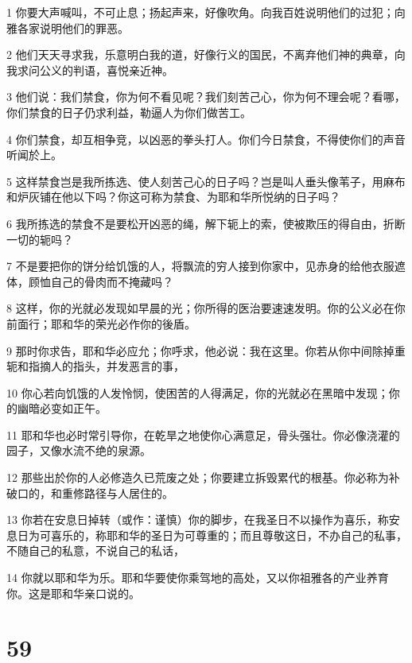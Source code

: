 \par 1 你要大声喊叫，不可止息；扬起声来，好像吹角。向我百姓说明他们的过犯；向雅各家说明他们的罪恶。
\par 2 他们天天寻求我，乐意明白我的道，好像行义的国民，不离弃他们神的典章，向我求问公义的判语，喜悦亲近神。
\par 3 他们说：我们禁食，你为何不看见呢？我们刻苦己心，你为何不理会呢？看哪，你们禁食的日子仍求利益，勒逼人为你们做苦工。
\par 4 你们禁食，却互相争竞，以凶恶的拳头打人。你们今日禁食，不得使你们的声音听闻於上。
\par 5 这样禁食岂是我所拣选、使人刻苦己心的日子吗？岂是叫人垂头像苇子，用麻布和炉灰铺在他以下吗？你这可称为禁食、为耶和华所悦纳的日子吗？
\par 6 我所拣选的禁食不是要松开凶恶的绳，解下轭上的索，使被欺压的得自由，折断一切的轭吗？
\par 7 不是要把你的饼分给饥饿的人，将飘流的穷人接到你家中，见赤身的给他衣服遮体，顾恤自己的骨肉而不掩藏吗？
\par 8 这样，你的光就必发现如早晨的光；你所得的医治要速速发明。你的公义必在你前面行；耶和华的荣光必作你的後盾。
\par 9 那时你求告，耶和华必应允；你呼求，他必说：我在这里。你若从你中间除掉重轭和指摘人的指头，并发恶言的事，
\par 10 你心若向饥饿的人发怜悯，使困苦的人得满足，你的光就必在黑暗中发现；你的幽暗必变如正午。
\par 11 耶和华也必时常引导你，在乾旱之地使你心满意足，骨头强壮。你必像浇灌的园子，又像水流不绝的泉源。
\par 12 那些出於你的人必修造久已荒废之处；你要建立拆毁累代的根基。你必称为补破口的，和重修路径与人居住的。
\par 13 你若在安息日掉转（或作：谨慎）你的脚步，在我圣日不以操作为喜乐，称安息日为可喜乐的，称耶和华的圣日为可尊重的；而且尊敬这日，不办自己的私事，不随自己的私意，不说自己的私话，
\par 14 你就以耶和华为乐。耶和华要使你乘驾地的高处，又以你祖雅各的产业养育你。这是耶和华亲口说的。

\chapter{59}

